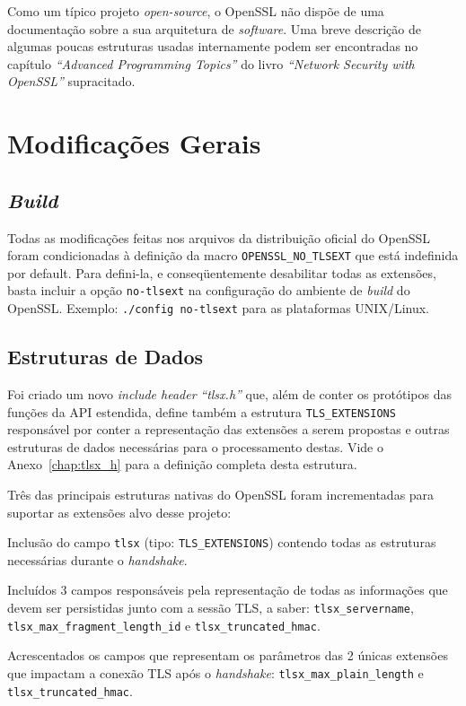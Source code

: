 Como um típico projeto \emph{open-source}, o OpenSSL não dispõe de uma documentação
sobre a sua arquitetura de \emph{software}. Uma breve descrição de algumas poucas estruturas
usadas internamente podem ser encontradas no capítulo \emph{``Advanced Programming Topics''} 
do livro \emph{``Network Security with OpenSSL''} supracitado.

\section{Modificações Gerais}

\subsection{\emph{Build}}

Todas as modificações feitas nos arquivos da distribuição oficial do OpenSSL 
foram condicionadas à definição da macro \verb|OPENSSL_NO_TLSEXT| que está
indefinida por default. Para defini-la, e conseqüentemente desabilitar todas as 
extensões, basta incluir a opção \verb|no-tlsext| na configuração do ambiente de 
\emph{build} do OpenSSL. Exemplo: \verb|./config no-tlsext| para as plataformas 
UNIX/Linux.

\subsection{Estruturas de Dados}

Foi criado um novo \emph{include header} \textit{``tlsx.h''} que, além de conter os protótipos 
das funções da \acs{API} estendida, define também a estrutura \verb|TLS_EXTENSIONS|
responsável por conter a representação das extensões a serem propostas e 
outras estruturas de dados necessárias para o processamento destas. Vide o Anexo~\ref{chap:tlsx_h}
para a definição completa desta estrutura.

Três das principais estruturas nativas do OpenSSL foram incrementadas para 
suportar as extensões alvo desse projeto:

\begin{description}[\breaklabel\setlabelstyle{\ttfamily}]

\item[ssl.h::SSL\_CTX, SSL]
	Inclusão do campo \verb|tlsx| (tipo: \verb|TLS_EXTENSIONS|) 
	contendo todas as estruturas necessárias durante o \emph{handshake}.

\item[ssl.h::SSL\_SESSION, ssl\_asn1.c::SSL\_SESSION\_ASN1]
	Incluídos 3 campos responsáveis pela representação de todas as informações que devem ser 
	persistidas junto com a sessão TLS, a saber: \verb|tlsx_servername|, 
	\verb|tlsx_max_fragment_length_id| e \verb|tlsx_truncated_hmac|.

\item[ssl3.h::SSL3\_STATE]
	Acrescentados os campos que representam os 
	parâmetros das 2 únicas extensões que impactam a conexão TLS após o 
	\emph{handshake}: \verb|tlsx_max_plain_length| e \verb|tlsx_truncated_hmac|.

\end{description}

